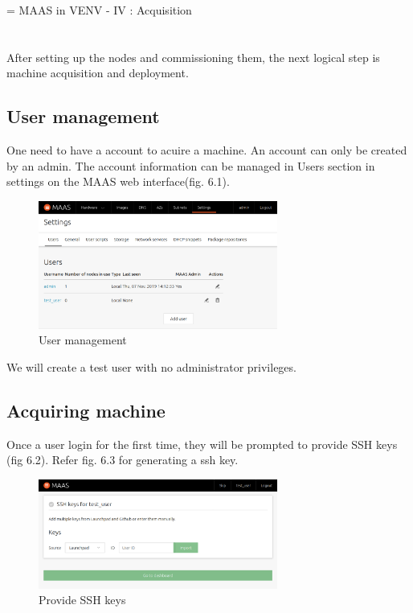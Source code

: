 \chapname = {MAAS in VENV - IV : Acquisition}

\chapter{\the\chapname}

After setting up the nodes and commissioning them, the next logical step is machine acquisition and deployment.

\section{User management}

One need to have a account to acuire a machine. An account can only be created by an admin. The account information can be managed in Users section in settings on the MAAS web interface(fig. 6.1).

\begin{figure}[!ht]
    \centering
    \includegraphics[width=0.7\textwidth]{images/6-1.png}
    \caption{User management}
\end{figure}

We will create a test user with no administrator privileges. 

\section{Acquiring machine}

Once a user login for the first time, they will be prompted to provide SSH keys (fig 6.2). Refer fig. 6.3 for generating a ssh key.

\begin{figure}[!ht]
    \centering
    \includegraphics[width=0.7\textwidth]{images/6-2.png}
    \caption{Provide SSH keys}
\end{figure}


